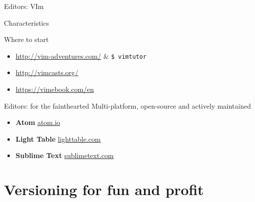 \documentclass[10pt]{beamer}
\begin{document}
\begin{frame}{Editors: VIm}
{\begin{block}{Characteristics}
\begin{itemize}
			\end{itemize}
		\end{block}
		\begin{block}{Where to start}
			\begin{itemize}
				\item \url{http://vim-adventures.com/} \& \texttt{\$ vimtutor}
				\item \url{http://vimcasts.org/}
				\item \url{https://vimebook.com/en}
			\end{itemize}
		\end{block}
	}
\end{frame}


\begin{frame}{Editors: for the fainthearted} %
	\large
	Multi-platform, open-source and actively maintained

	\medskip

	\begin{itemize}
		\item \textbf{Atom} \hfill \url{atom.io}
		\item \textbf{Light Table} \hfill \url{lighttable.com}
		\item \textbf{Sublime Text} \hfill \url{sublimetext.com}
	\end{itemize}

\end{frame}

\section{Versioning for fun and profit} %
\end{document}

